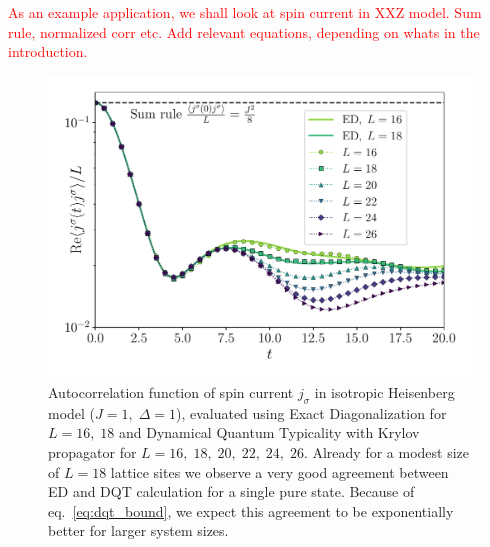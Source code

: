 \textcolor{red}{
As an example application, we shall look at spin current in XXZ model. Sum rule, normalized corr etc.
}
\textcolor{red}{Add relevant equations, depending on whats in the introduction.}

\begin{figure}[htbp]
	\centering
	\includegraphics[width=\textwidth]{Figures/autocorr_spin_current.pdf}
	\caption{Autocorrelation function of spin current \(j_{\sigma}\) in isotropic Heisenberg model
	(\(J=1,\;\Delta=1\)), evaluated
	using Exact Diagonalization for \(L=16,\;18\) and Dynamical Quantum Typicality with Krylov propagator
	for \(L=16,\;18,\;20,\;22,\;24,\;26\). Already for a modest size of \(L=18\) lattice sites we observe
	a very good agreement between ED and DQT calculation for a single pure state. Because of eq.~\eqref{eq:dqt_bound},
	we expect this agreement to be exponentially better for larger system sizes.}
	\label{fig:spin_autocorr}
\end{figure}

